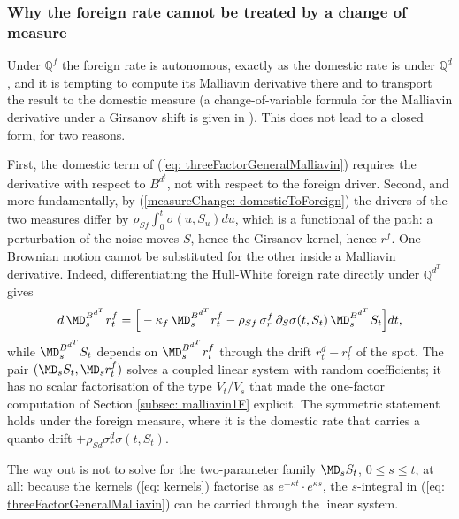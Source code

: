 \subsubsection{Why the foreign rate cannot be treated by a change of measure}\label{subsubsec: obstacle}
Under $\mathbb{Q}^{f}$ the foreign rate is autonomous, exactly as the domestic rate is under $\mathbb{Q}^d$, and it is tempting to compute its Malliavin derivative there and to transport the result to the domestic measure (a change-of-variable formula for the Malliavin derivative under a Girsanov shift is given in \cite{ewald}). This does not lead to a closed form, for two reasons.

First, the domestic term of (\ref{eq: threeFactorGeneralMalliavin}) requires the derivative with respect to $B^{d^t}$, not with respect to the foreign driver.
Second, and more fundamentally, by (\ref{measureChange: domesticToForeign}) the drivers of the two measures differ by $\rho_{Sf}\int_0^t\sigma(u,S_u)du$, which is a functional of the path: a perturbation of the noise moves $S$, hence the Girsanov kernel, hence $r^f$. One Brownian motion cannot be substituted for the other inside a Malliavin derivative. Indeed, differentiating the Hull-White foreign rate directly under $\mathbb{Q}^{d^T}$ gives
$$ d\,\MD^{B^{d^T}}_sr^f_t=\Big[-\kappa_f\,\MD^{B^{d^T}}_sr^f_t-\rho_{Sf}\,\sigma^f_r\,\partial_S\sigma(t,S_t)\,\MD^{B^{d^T}}_sS_t\Big]dt, $$
while $\MD^{B^{d^T}}_sS_t$ depends on $\MD^{B^{d^T}}_sr^f_t$ through the drift $r^d_t-r^f_t$ of the spot. The pair $(\MD_sS_t,\MD_sr^f_t)$ solves a coupled linear system with random coefficients; it has no scalar factorisation of the type $V_t/V_s$ that made the one-factor computation of Section \ref{subsec: malliavin1F} explicit. The symmetric statement holds under the foreign measure, where it is the domestic rate that carries a quanto drift $+\rho_{Sd}\sigma^d_r\sigma(t,S_t)$.

The way out is not to solve for the two-parameter family $\MD_sS_t$, $0\leq s\leq t$, at all: because the kernels (\ref{eq: kernels}) factorise as $e^{-\kappa t}\cdot e^{\kappa s}$, the $s$-integral in (\ref{eq: threeFactorGeneralMalliavin}) can be carried through the linear system.

